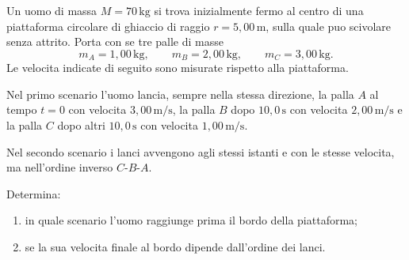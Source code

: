 
\begin{esercizio}
Un uomo di massa \(M=70\,\mathrm{kg}\) si trova inizialmente fermo al centro
di una piattaforma circolare di ghiaccio di raggio \(r=5{,}00\,\mathrm{m}\),
sulla quale puo scivolare senza attrito. Porta con se tre palle di masse
\[
m_A=1{,}00\,\mathrm{kg},\qquad
m_B=2{,}00\,\mathrm{kg},\qquad
m_C=3{,}00\,\mathrm{kg}.
\]
Le velocita indicate di seguito sono misurate rispetto alla piattaforma.

Nel primo scenario l'uomo lancia, sempre nella stessa direzione, la palla
\(A\) al tempo \(t=0\) con velocita \(3{,}00\,\mathrm{m/s}\), la palla \(B\)
dopo \(10{,}0\,\mathrm{s}\) con velocita \(2{,}00\,\mathrm{m/s}\) e la palla
\(C\) dopo altri \(10{,}0\,\mathrm{s}\) con velocita
\(1{,}00\,\mathrm{m/s}\).

Nel secondo scenario i lanci avvengono agli stessi istanti e con le stesse
velocita, ma nell'ordine inverso \(C\)-\(B\)-\(A\).

Determina:
\begin{enumerate}
\item in quale scenario l'uomo raggiunge prima il bordo della piattaforma;
\item se la sua velocita finale al bordo dipende dall'ordine dei lanci.
\end{enumerate}
\end{esercizio}

